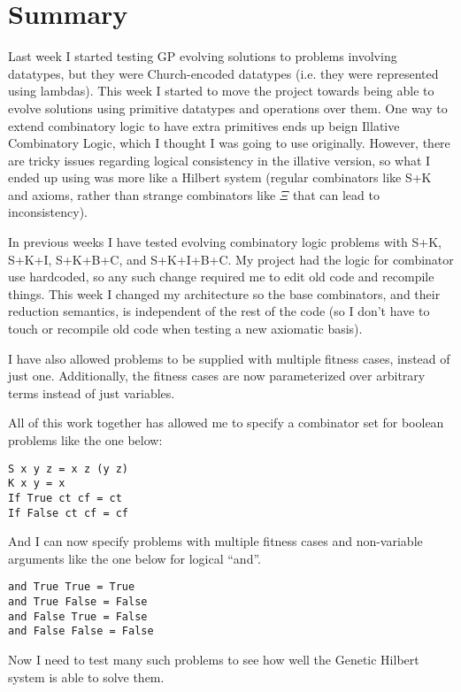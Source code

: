 \documentclass{article}
\begin{document}
\maketitle

\section{Summary}

Last week I started testing GP evolving solutions to problems
involving datatypes, but they were Church-encoded datatypes (i.e. they
were represented using lambdas). This week I started to move the
project towards being able to evolve solutions using primitive
datatypes and operations over them. One way to extend combinatory
logic to have extra primitives ends up beign Illative Combinatory
Logic, which I thought I was going to use originally. However, there
are tricky issues regarding logical consistency in the illative
version, so what I ended up using was more like a Hilbert system
(regular combinators like S+K and axioms, rather than strange
combinators like $\Xi$ that can lead to inconsistency).

In previous weeks I have tested evolving combinatory logic problems
with S+K, S+K+I, S+K+B+C, and S+K+I+B+C. My project had the logic for
combinator use hardcoded, so any such change required me to edit old
code and recompile things. This week I changed my architecture so the
base combinators, and their reduction semantics, is independent
of the rest of the code (so I don't have to touch or recompile old
code when testing a new axiomatic basis).

I have also allowed problems to be supplied with multiple fitness
cases, instead of just one. Additionally, the fitness cases are now
parameterized over arbitrary terms instead of just variables.

All of this work together has allowed me to specify a combinator set
for boolean problems like the one below:

\begin{verbatim}
S x y z = x z (y z)
K x y = x
If True ct cf = ct
If False ct cf = cf
\end{verbatim}

And I can now specify problems with multiple fitness cases and
non-variable arguments like the one below for logical ``and''.

\begin{verbatim}
and True True = True
and True False = False
and False True = False
and False False = False
\end{verbatim}

Now I need to test many such problems to see how well the Genetic
Hilbert system is able to solve them.
\end{document}
